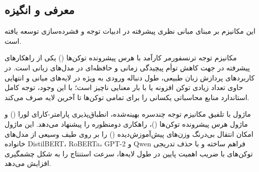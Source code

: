 \subsection{معرفی و انگیزه}
این مکانیزم بر مبنای مبانی نظری پیشرفته در ادبیات توجه و فشرده‌سازی \cite{kim2022learned} توسعه یافته است.

مکانیزم توجه ترنسفورمر کارآمد با هرس پیشرونده توکن‌ها () یکی از راهکارهای پیشرفته در جهت کاهش توأم پیچیدگی زمانی و حافظه‌ای در مدل‌های زبانی است. در کاربردهای پردازش زبان طبیعی، طول دنباله ورودی به ویژه در لایه‌های میانی و انتهایی حاوی تعداد زیادی توکن افزونه یا با بار معنایی ناچیز است؛ با این وجود، توجه کامل استاندارد منابع محاسباتی یکسانی را برای تمامی توکن‌ها تا آخرین لایه صرف می‌کند.

ماژول  با تلفیق مکانیزم توجه چندسره بهینه‌شده، انطباق‌پذیری پارامتر-کارای لورا () و ماژول هرس پیشرونده توکن‌ها ()، راهکاری دومنظوره را پیشنهاد می‌دهد. این ماژول امکان انتقال بی‌درنگ وزن‌های پیش‌آموزش‌دیده () را بر روی طیف وسیعی از مدل‌های خانواده DistilBERT، RoBERTa، GPT-2 و Qwen فراهم ساخته و با حذف تدریجی توکن‌های با ضریب اهمیت پایین در طول لایه‌ها، سرعت استنتاج را به شکل چشمگیری افزایش می‌دهد.
